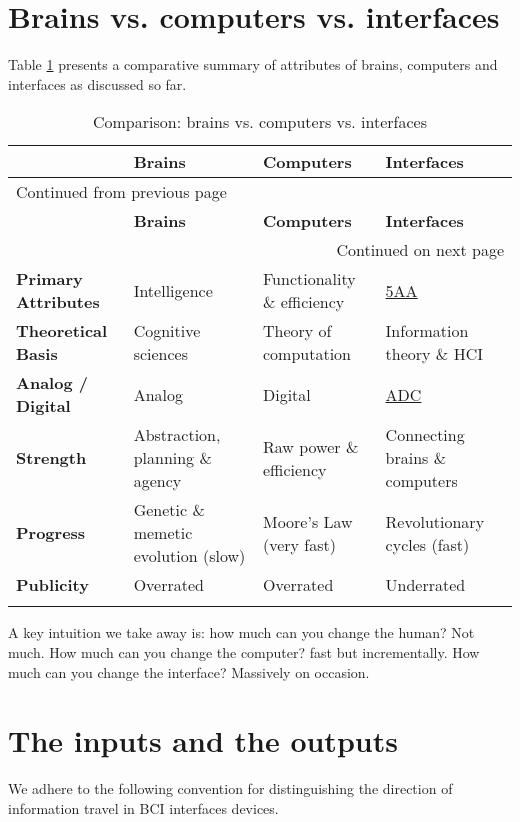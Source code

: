 \documentclass[logo,bsc,singlespacing,parskip]{infthesis}
\begin{document}
\section{Brains vs. computers vs. interfaces}
\label{sec:org25f1e0d}
Table \ref{tab:b_vs_c_vs_i} presents a comparative summary of attributes of brains, computers and interfaces as discussed so far.
{\small %
{\renewcommand{\arraystretch}{1.2} %
\begin{longtable}{|p{1.8cm}|p{3.0cm}|p{3.0cm}|p{3.0cm}|}
\hline
 & \textbf{Brains} & \textbf{Computers} & \textbf{Interfaces}\\
\hline
\endfirsthead
\multicolumn{4}{l}{Continued from previous page} \\
\hline

 & \textbf{Brains} & \textbf{Computers} & \textbf{Interfaces} \\

\hline
\endhead
\hline\multicolumn{4}{r}{Continued on next page} \\
\endfoot
\endlastfoot
\hline
\textbf{Primary Attributes} & Intelligence & Functionality \& efficiency & \hyperref[orgce96c46]{5AA}\\
\hline
\textbf{Theoretical Basis} & Cognitive sciences & Theory of computation & Information theory \& HCI\\
\hline
\textbf{Analog / Digital} & Analog & Digital & \hyperref[org146c745]{ADC}\footnotemark\\
\hline
\textbf{Strength} & Abstraction, planning \& agency & Raw power \& efficiency & Connecting brains \& computers\\
\hline
\textbf{Progress} & Genetic \& memetic evolution (slow) & Moore's Law (very fast) & Revolutionary cycles (fast)\\
\hline
\textbf{Publicity} & Overrated & Overrated & Underrated\\
\hline
\caption{\label{tab:b_vs_c_vs_i}Comparison: brains vs. computers vs. interfaces}
\\
\end{longtable}
}
}

A key intuition we take away is: how much can you change the human? Not much. How much can you change the computer? fast but incrementally. How much can you change the interface? Massively on occasion.

\section{The inputs and the outputs}
\label{sec:orgf2be3cd}
We adhere to the following convention for distinguishing the direction of information travel in BCI interfaces devices.
\medskip
\end{document}
